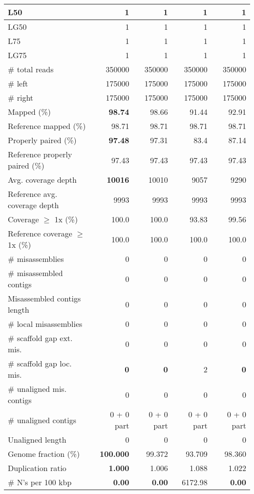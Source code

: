 \documentclass[12pt,a4paper]{article}
\begin{document}
\begin{table}[ht]
\begin{center}
\begin{tabular}{|l*{4}{|r}|}
L50 & 1 & 1 & 1 & 1 \\ \hline
LG50 & 1 & 1 & 1 & 1 \\ \hline
L75 & 1 & 1 & 1 & 1 \\ \hline
LG75 & 1 & 1 & 1 & 1 \\ \hline
\# total reads & 350000 & 350000 & 350000 & 350000 \\ \hline
\# left & 175000 & 175000 & 175000 & 175000 \\ \hline
\# right & 175000 & 175000 & 175000 & 175000 \\ \hline
Mapped (\%) & {\bf 98.74} & 98.66 & 91.44 & 92.91 \\ \hline
Reference mapped (\%) & 98.71 & 98.71 & 98.71 & 98.71 \\ \hline
Properly paired (\%) & {\bf 97.48} & 97.31 & 83.4 & 87.14 \\ \hline
Reference properly paired (\%) & 97.43 & 97.43 & 97.43 & 97.43 \\ \hline
Avg. coverage depth & {\bf 10016} & 10010 & 9057 & 9290 \\ \hline
Reference avg. coverage depth & 9993 & 9993 & 9993 & 9993 \\ \hline
Coverage $\geq$ 1x (\%) & 100.0 & 100.0 & 93.83 & 99.56 \\ \hline
Reference coverage $\geq$ 1x (\%) & 100.0 & 100.0 & 100.0 & 100.0 \\ \hline
\# misassemblies & 0 & 0 & 0 & 0 \\ \hline
\# misassembled contigs & 0 & 0 & 0 & 0 \\ \hline
Misassembled contigs length & 0 & 0 & 0 & 0 \\ \hline
\# local misassemblies & 0 & 0 & 0 & 0 \\ \hline
\# scaffold gap ext. mis. & 0 & 0 & 0 & 0 \\ \hline
\# scaffold gap loc. mis. & {\bf 0} & {\bf 0} & 2 & {\bf 0} \\ \hline
\# unaligned mis. contigs & 0 & 0 & 0 & 0 \\ \hline
\# unaligned contigs & 0 + 0 part & 0 + 0 part & 0 + 0 part & 0 + 0 part \\ \hline
Unaligned length & 0 & 0 & 0 & 0 \\ \hline
Genome fraction (\%) & {\bf 100.000} & 99.372 & 93.709 & 98.360 \\ \hline
Duplication ratio & {\bf 1.000} & 1.006 & 1.088 & 1.022 \\ \hline
\# N's per 100 kbp & {\bf 0.00} & {\bf 0.00} & 6172.98 & {\bf 0.00} \\ \hline

\end{tabular}
\end{center}
\end{table}
\end{document}
